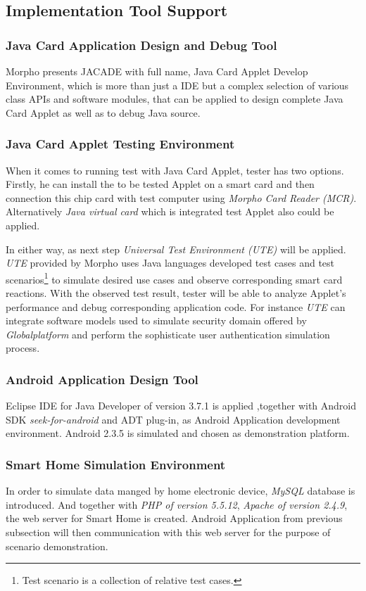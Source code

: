 \subsection{Implementation Tool Support}
\subsubsection{Java Card Application Design and Debug Tool}
Morpho presents JACADE with full name, Java Card Applet Develop Environment, which is more than just a IDE but a complex selection of various class APIs and software modules, that can be applied to design complete Java Card Applet as well as to debug Java source. 
\subsubsection{Java Card Applet Testing Environment}
When it comes to running test with Java Card Applet, tester has two options. Firstly, he can install the to be tested Applet on a smart card and then connection this chip card with test computer using \emph{Morpho Card Reader (MCR)}. Alternatively \emph{Java virtual card} which is integrated test Applet also could be applied. 

In either way, as next step \emph{Universal Test Environment (UTE)} will be applied. \emph{UTE} provided by Morpho uses Java languages developed test cases
 and test scenarios\footnote{Test scenario is a collection of relative test cases.} to simulate desired use cases and observe corresponding smart card reactions. With the observed test result, tester will be able to analyze Applet's performance and debug corresponding application code. For instance \emph{UTE} can integrate software models used to simulate security domain offered by \emph{Globalplatform} and perform the sophisticate user authentication simulation process.
\subsubsection{Android Application Design Tool}
Eclipse IDE for Java Developer of version 3.7.1 is applied ,together with Android SDK \emph{seek-for-android} and ADT plug-in, as Android Application development environment. Android 2.3.5 is simulated and chosen as demonstration platform.
\subsubsection{Smart Home Simulation Environment}
In order to simulate data manged by home electronic device, \emph{MySQL} database is introduced. And together with \emph{PHP of version 5.5.12}, \emph{Apache of version 2.4.9}, the web server for Smart Home is created. Android Application from previous subsection will then communication with this web server for the purpose of scenario demonstration.